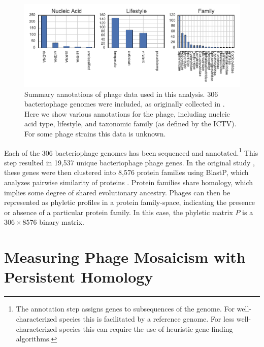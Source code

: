 \begin{figure}
\centering
\includegraphics[]{./fig/phage/phage_data_plots.pdf}
\caption[Summary annotations of 306 bacteriophage strains used in this study]{Summary annotations of phage data used in this analysis. 306 bacteriophage genomes were included, as originally collected in \cite{LimaMendez:2008ki}. Here we show various annotations for the phage, including nucleic acid type, lifestyle, and taxonomic family (as defined by the ICTV). For some phage strains this data is unknown.}
\label{phage:fig:phage_data_plot}
\end{figure}

Each of the 306 bacteriophage genomes has been sequenced and annotated.\footnote{The annotation step assigns genes to subsequences of the genome. For well-characterized species this is facilitated by a reference genome. For less well-characterized species this can require the use of heuristic gene-finding algorithms.}
This step resulted in 19,537 unique bacteriophage phage genes.
In the original study \cite{LimaMendez:2008ki}, these genes were then clustered into 8,576 protein families using BlastP, which analyzes pairwise similarity of proteins \cite{Altschul:1997a}.
Protein families share homology, which implies some degree of shared evolutionary ancestry.
Phages can then be represented as phyletic profiles in a protein family-space, indicating the presence or absence of a particular protein family.
In this case, the phyletic matrix $P$ is a $306\times8576$ binary matrix.

\section{Measuring Phage Mosaicism with Persistent Homology}
\label{phage:ph}

